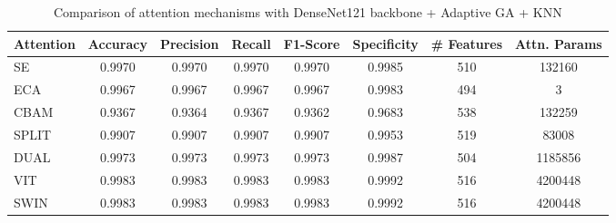 \begin{table}[htbp]
\centering
\caption{Comparison of attention mechanisms with DenseNet121 backbone + Adaptive GA + KNN}
\label{tab:table5}
\begin{tabular}{lccccccc}
\toprule
Attention & Accuracy & Precision & Recall & F1-Score & Specificity & \# Features & Attn. Params \\
\midrule
SE & 0.9970 & 0.9970 & 0.9970 & 0.9970 & 0.9985 & 510 & 132160 \\
ECA & 0.9967 & 0.9967 & 0.9967 & 0.9967 & 0.9983 & 494 & 3 \\
CBAM & 0.9367 & 0.9364 & 0.9367 & 0.9362 & 0.9683 & 538 & 132259 \\
SPLIT & 0.9907 & 0.9907 & 0.9907 & 0.9907 & 0.9953 & 519 & 83008 \\
DUAL & 0.9973 & 0.9973 & 0.9973 & 0.9973 & 0.9987 & 504 & 1185856 \\
VIT & 0.9983 & 0.9983 & 0.9983 & 0.9983 & 0.9992 & 516 & 4200448 \\
SWIN & 0.9983 & 0.9983 & 0.9983 & 0.9983 & 0.9992 & 516 & 4200448 \\
\bottomrule
\end{tabular}
\end{table}